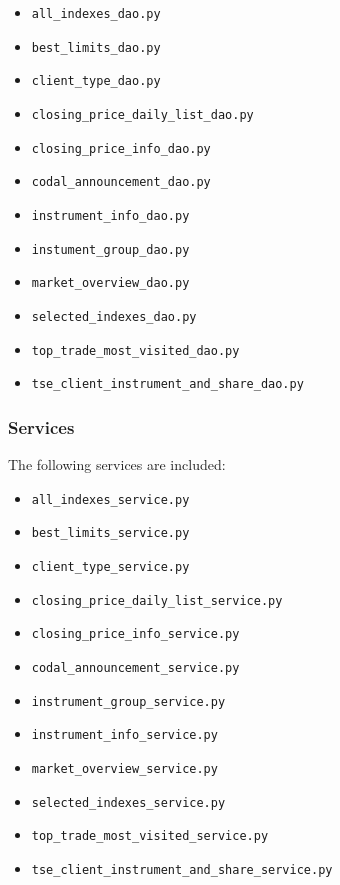 {	\begin{itemize}
	    \item \texttt{all\_indexes\_dao.py}
	    \item \texttt{best\_limits\_dao.py}
	    \item \texttt{client\_type\_dao.py}
	    \item \texttt{closing\_price\_daily\_list\_dao.py}
	    \item \texttt{closing\_price\_info\_dao.py}
	    \item \texttt{codal\_announcement\_dao.py}
	    \item \texttt{instrument\_info\_dao.py}
	    \item \texttt{instument\_group\_dao.py}
	    \item \texttt{market\_overview\_dao.py}
	    \item \texttt{selected\_indexes\_dao.py}
	    \item \texttt{top\_trade\_most\_visited\_dao.py}
	    \item \texttt{tse\_client\_instrument\_and\_share\_dao.py}
	\end{itemize}

	\subsubsection{Services}

	The following services are included:

	\begin{itemize}
	    \item \texttt{all\_indexes\_service.py}
	    \item \texttt{best\_limits\_service.py}
	    \item \texttt{client\_type\_service.py}
	    \item \texttt{closing\_price\_daily\_list\_service.py}
	    \item \texttt{closing\_price\_info\_service.py}
	    \item \texttt{codal\_announcement\_service.py}
	    \item \texttt{instrument\_group\_service.py}
	    \item \texttt{instrument\_info\_service.py}
	    \item \texttt{market\_overview\_service.py}
	    \item \texttt{selected\_indexes\_service.py}
	    \item \texttt{top\_trade\_most\_visited\_service.py}
	    \item \texttt{tse\_client\_instrument\_and\_share\_service.py}
	\end{itemize}

}
